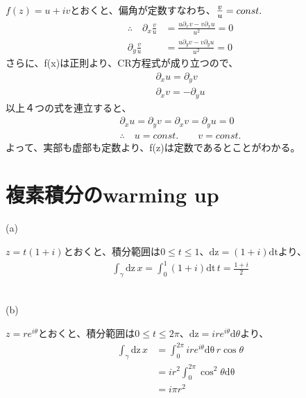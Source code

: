 \documentclass[dvipdfmx,a4paper]{jsarticle}
\begin{document}
\subsection{}
$f(z) = u+iv $とおくと、偏角が定数すなわち、$\mbox{\large $\frac{v}{u}$} = const.$\\
\begin{align*}
\therefore \quad \partial_x \frac{v}{u} &= \frac{u\partial_x v - v\partial_x u}{u^2} = 0\\
\partial_y \frac{v}{u} &= \frac{u\partial_y v - v\partial_y u}{u^2} = 0
\end{align*}
さらに、f(x)は正則より、CR方程式が成り立つので、
\begin{align*}
\partial_x u = \partial_y v \\
\partial_x v = -\partial_y u
\end{align*}
以上４つの式を連立すると、
\begin{align*}
\partial_x u = \partial_y v = \partial_x v = \partial_y u = 0\\
\therefore \quad u = const. \qquad v = const.
\end{align*}
よって、実部も虚部も定数より、f(z)は定数であるとことがわかる。\\

\newpage

\section{複素積分のwarming up}
\begin{flushleft}
(a)
\end{flushleft}
$z = t(1+i)$とおくと、積分範囲は$0 \leq t \leq 1、\mathrm{dz} = (1+i)\mathrm{dt}$より、
\begin{align*}
\int_{\gamma}\mathrm{dz} \, x = \int^{1}_{0} (1+i) \mathrm{dt}\,  t = \frac{1+i}{2}
\end{align*}
\\

\begin{flushleft}
(b)
\end{flushleft}
$z = re^{i\theta}$とおくと、積分範囲は$0 \leq t \leq 2\pi、\mathrm{dz} = ire^{i\theta}\mathrm{d}\theta$より、
\begin{align*}
\int_{\gamma}\mathrm{dz}\,  x &= \int^{2\pi}_{0} ire^{i\theta}\mathrm{d\theta}\,  r \cos{\theta}\\
&= ir^2\int^{2\pi}_{0} \cos^2{\theta} \mathrm{d\theta}\\
&= i\pi r^2
\end{align*}
\\
\end{document}
